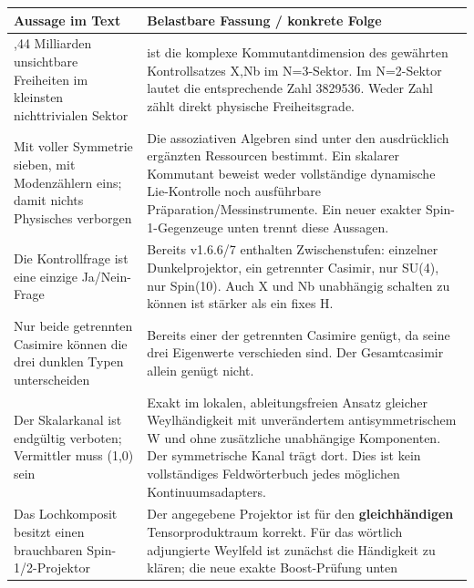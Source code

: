 {\def\LTcaptype{none} %
\begin{longtable}[]{@{}
  >{\raggedright\arraybackslash}p{}
  >{\raggedright\arraybackslash}p{}@{}}
\toprule\noalign{}
\begin{minipage}[b]{\linewidth}\raggedright
Aussage im Text
\end{minipage} & \begin{minipage}[b]{\linewidth}\raggedright
Belastbare Fassung / konkrete Folge
\end{minipage} \\
\midrule\noalign{}
\endhead
\bottomrule\noalign{}
\endlastfoot
1,44 Milliarden unsichtbare Freiheiten im kleinsten nichttrivialen
Sektor & 1444233216 ist die komplexe Kommutantdimension des gewährten
Kontrollsatzes X,Nb im N=3-Sektor. Im N=2-Sektor lautet die
entsprechende Zahl 3829536. Weder Zahl zählt direkt physische
Freiheitsgrade. \\
Mit voller Symmetrie sieben, mit Modenzählern eins; damit nichts
Physisches verborgen & Die assoziativen Algebren sind unter den
ausdrücklich ergänzten Ressourcen bestimmt. Ein skalarer Kommutant
beweist weder vollständige dynamische Lie-Kontrolle noch ausführbare
Präparation/Messinstrumente. Ein neuer exakter Spin-1-Gegenzeuge unten
trennt diese Aussagen. \\
Die Kontrollfrage ist eine einzige Ja/Nein-Frage & Bereits v1.6.6/7
enthalten Zwischenstufen: einzelner Dunkelprojektor, ein getrennter
Casimir, nur SU(4), nur Spin(10). Auch X und Nb unabhängig schalten zu
können ist stärker als ein fixes H. \\
Nur beide getrennten Casimire können die drei dunklen Typen
unterscheiden & Bereits einer der getrennten Casimire genügt, da seine
drei Eigenwerte verschieden sind. Der Gesamtcasimir allein genügt
nicht. \\
Der Skalarkanal ist endgültig verboten; Vermittler muss (1,0) sein &
Exakt im lokalen, ableitungsfreien Ansatz gleicher Weylhändigkeit mit
unverändertem antisymmetrischem W und ohne zusätzliche unabhängige
Komponenten. Der symmetrische Kanal trägt dort. Dies ist kein
vollständiges Feldwörterbuch jedes möglichen Kontinuumsadapters. \\
Das Lochkomposit besitzt einen brauchbaren Spin-1/2-Projektor & Der
angegebene Projektor ist für den \textbf{gleichhändigen}
Tensorproduktraum korrekt. Für das wörtlich adjungierte Weylfeld ist
zunächst die Händigkeit zu klären; die neue exakte Boost-Prüfung unten

\end{longtable}}
